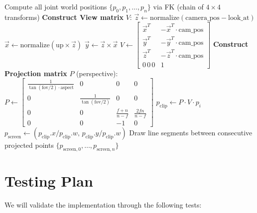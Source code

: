\documentclass[11pt]{article}
\begin{document}
\begin{algorithm}[H]
\caption{Rendering Pipeline (per frame)}
\begin{algorithmic}[1]
\State Compute all joint world positions $\{p_0, p_1, \dots, p_n\}$ via FK (chain of $4\times4$ transforms)
\State \textbf{Construct View matrix} $V$:
\State \quad $\vec{z} \gets \text{normalize}(\text{camera\_pos} - \text{look\_at})$ 
\State \quad $\vec{x} \gets \text{normalize}(\text{up} \times \vec{z})$ 
\State \quad $\vec{y} \gets \vec{z} \times \vec{x}$ 
\State \quad $V \gets \begin{bmatrix} \vec{x}^T & -\vec{x}^T \cdot \text{cam\_pos} \\ \vec{y}^T & -\vec{y}^T \cdot \text{cam\_pos} \\ \vec{z}^T & -\vec{z}^T \cdot \text{cam\_pos} \\ 0\,0\,0 & 1 \end{bmatrix}$ 
\State \textbf{Construct Projection matrix} $P$ (perspective):
\State \quad $P \gets \begin{bmatrix} \frac{1}{\tan(\text{fov}/2) \cdot \text{aspect}} & 0 & 0 & 0 \\ 0 & \frac{1}{\tan(\text{fov}/2)} & 0 & 0 \\ 0 & 0 & \frac{f+n}{n-f} & \frac{2fn}{n-f} \\ 0 & 0 & -1 & 0 \end{bmatrix}$
    \State $p_{\text{clip}} \gets P \cdot V \cdot p_i$ 
    \State $p_{\text{screen}} \gets (p_{\text{clip}}.x / p_{\text{clip}}.w,\, p_{\text{clip}}.y / p_{\text{clip}}.w)$ 
\EndFor
\State Draw line segments between consecutive projected points $\{p_{\text{screen},0}, \dots, p_{\text{screen},n}\}$
\end{algorithmic}
\end{algorithm}

\section{Testing Plan}

We will validate the implementation through the following tests:
\end{document}
